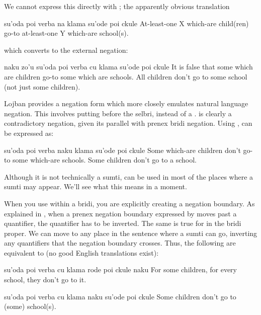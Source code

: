 We cannot express this directly with ; the apparently
    obvious translation
\begin{example}
su'oda poi verba\n
\T	na klama su'ode poi ckule\n
At-least-one X which-are child(ren)\n
\T	{} go-to at-least-one Y which-are school(s).
\end{example}

{\noindent}which converts to the external negation:
\begin{example}
naku zo'u su'oda poi verba\n
\T	cu klama su'ode poi ckule\n
It is false that some which are children\n
\T	go-to some which are schools.\n
All children don't go to some school\n
\T	(not just some children).
\end{example}

Lojban provides a negation form which more closely emulates
    natural language negation. This involves putting 
    before the selbri, instead of a .  is clearly a
    contradictory negation, given its parallel with prenex bridi
    negation. Using ,  can
    be expressed as:
\begin{example}
su'oda poi verba naku klama\n
\T	su'ode poi ckule\n
Some which-are children don't go-to\n
\T	some which-are schools.\n
Some children don't go to a school.
\end{example}

Although it is not technically a sumti,  can be used in
    most of the places where a sumti may appear. We'll see what
    this means in a moment. 

When you use  within a bridi, you are explicitly
    creating a negation boundary. As explained in , when a prenex negation boundary
    expressed by  moves past a quantifier, the quantifier
    has to be inverted. The same is true for  in the bridi
    proper. We can move  to any place in the sentence where
    a sumti can go, inverting any quantifiers that the negation
    boundary crosses. Thus, the following are equivalent to  (no good English translations
    exist):
\begin{example}
su'oda poi verba cu klama rode poi ckule naku\n
For some children, for every school,\n
\T	they don't go to it.
\end{example}

\begin{example}
su'oda poi verba cu klama naku su'ode poi ckule\n
Some children don't go to (some) school(s).
\end{example}

